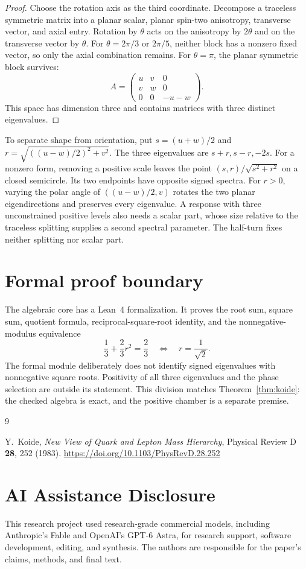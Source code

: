 \documentclass[11pt]{article}
\theoremstyle{remark}
\begin{document}
\begin{proof}
Choose the rotation axis as the third coordinate. Decompose a traceless
symmetric matrix into a planar scalar, planar spin-two anisotropy, transverse
vector, and axial entry. Rotation by \(\theta\) acts on the anisotropy by
\(2\theta\) and on the transverse vector by \(\theta\). For
\(\theta=2\pi/3\) or \(2\pi/5\), neither block has a nonzero fixed vector, so
only the axial combination remains. For \(\theta=\pi\), the planar symmetric
block survives:
\[
A=\begin{pmatrix}
u&v&0\\
v&w&0\\
0&0&-u-w
\end{pmatrix}.
\]
This space has dimension three and contains matrices with three distinct
eigenvalues.
\end{proof}

To separate shape from orientation, put \(s=(u+w)/2\) and
\(r=\sqrt{((u-w)/2)^2+v^2}\). The three eigenvalues are \(s+r,s-r,-2s\).
For a nonzero form, removing a positive scale leaves the point
\((s,r)/\sqrt{s^2+r^2}\) on a closed semicircle. Its two endpoints
have opposite signed spectra. For \(r>0\), varying the polar angle of \(((u-w)/2,v)\)
rotates the two planar eigendirections and preserves every eigenvalue.
A response with three unconstrained positive levels also needs a scalar
part, whose size relative to the traceless splitting supplies a second
spectral parameter. The half-turn fixes neither splitting nor scalar part.

\section{Formal proof boundary}

The algebraic core has a Lean~4 formalization. It proves the root sum, square
sum, quotient formula, reciprocal-square-root identity, and the
nonnegative-modulus equivalence
\[
\frac13+\frac23r^2=\frac23
\quad\Longleftrightarrow\quad
r=\frac1{\sqrt2}.
\]
The formal module deliberately does not identify signed eigenvalues with
nonnegative square roots. Positivity of all three eigenvalues and the phase
selection are outside its statement. This division matches
Theorem~\ref{thm:koide}: the checked algebra is exact, and the positive
chamber is a separate premise.

\begin{thebibliography}{9}

Y.~Koide,
\emph{New View of Quark and Lepton Mass Hierarchy},
Physical Review D \textbf{28}, 252 (1983).
\url{https://doi.org/10.1103/PhysRevD.28.252}

\end{thebibliography}

\section*{AI Assistance Disclosure}
This research project used research-grade commercial models, including
Anthropic's Fable and OpenAI's GPT-6 Astra, for research support, software
development, editing, and synthesis. The authors are responsible for the
paper's claims, methods, and final text.
\end{document}
